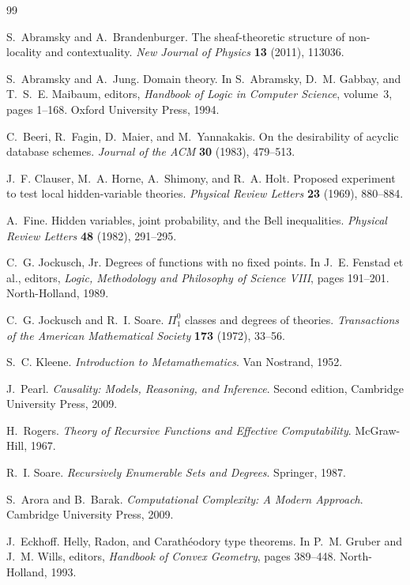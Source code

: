 \documentclass[11pt]{article}
\theoremstyle{plain}
\theoremstyle{definition}
\theoremstyle{remark}
\begin{document}
\begin{thebibliography}{99}

S.~Abramsky and A.~Brandenburger. The sheaf-theoretic structure of non-locality
and contextuality. \emph{New Journal of Physics} \textbf{13} (2011), 113036.

S.~Abramsky and A.~Jung. Domain theory. In S.~Abramsky, D.~M. Gabbay, and
T.~S.~E. Maibaum, editors, \emph{Handbook of Logic in Computer Science},
volume~3, pages 1--168. Oxford University Press, 1994.

C.~Beeri, R.~Fagin, D.~Maier, and M.~Yannakakis. On the desirability of acyclic
database schemes. \emph{Journal of the ACM} \textbf{30} (1983), 479--513.

J.~F. Clauser, M.~A. Horne, A.~Shimony, and R.~A. Holt. Proposed experiment to
test local hidden-variable theories. \emph{Physical Review Letters}
\textbf{23} (1969), 880--884.

A.~Fine. Hidden variables, joint probability, and the Bell inequalities.
\emph{Physical Review Letters} \textbf{48} (1982), 291--295.

C.~G. Jockusch, Jr. Degrees of functions with no fixed points. In
J.~E. Fenstad et al., editors, \emph{Logic, Methodology and Philosophy of
Science VIII}, pages 191--201. North-Holland, 1989.

C.~G. Jockusch and R.~I. Soare. $\Pi^0_1$ classes and degrees of theories.
\emph{Transactions of the American Mathematical Society} \textbf{173} (1972),
33--56.

S.~C. Kleene. \emph{Introduction to Metamathematics}. Van Nostrand, 1952.

J.~Pearl. \emph{Causality: Models, Reasoning, and Inference}. Second edition,
Cambridge University Press, 2009.

H.~Rogers. \emph{Theory of Recursive Functions and Effective Computability}.
McGraw-Hill, 1967.

R.~I. Soare. \emph{Recursively Enumerable Sets and Degrees}. Springer, 1987.

S.~Arora and B.~Barak. \emph{Computational Complexity: A Modern Approach}.
Cambridge University Press, 2009.

J.~Eckhoff. Helly, Radon, and Carath\'eodory type theorems. In
P.~M. Gruber and J.~M. Wills, editors, \emph{Handbook of Convex Geometry},
pages 389--448. North-Holland, 1993.


\end{thebibliography}
\end{document}
